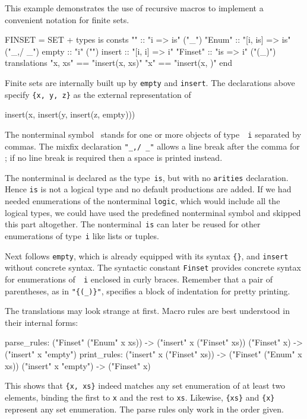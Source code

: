 This example demonstrates the use of recursive macros to implement a
convenient notation for finite sets.
\begin{ttbox}
FINSET = SET +
types
  is
consts
  ""            :: "i => is"                ("_")
  "{\at}Enum"       :: "[i, is] => is"          ("_,/ _")
  empty         :: "i"                      ("{\ttlbrace}{\ttrbrace}")
  insert        :: "[i, i] => i"
  "{\at}Finset"     :: "is => i"                ("{\ttlbrace}(_){\ttrbrace}")
translations
  "{\ttlbrace}x, xs{\ttrbrace}"     == "insert(x, {\ttlbrace}xs{\ttrbrace})"
  "{\ttlbrace}x{\ttrbrace}"         == "insert(x, {\ttlbrace}{\ttrbrace})"
end
\end{ttbox}
Finite sets are internally built up by {\tt empty} and {\tt insert}.  The
declarations above specify \verb|{x, y, z}| as the external representation
of
\begin{ttbox}
insert(x, insert(y, insert(z, empty)))
\end{ttbox}
The nonterminal symbol~ stands for one or more objects of type~{\tt
  i} separated by commas.  The mixfix declaration \hbox{\verb|"_,/ _"|}
allows a line break after the comma for ; if no
line break is required then a space is printed instead.

The nonterminal is declared as the type~{\tt is}, but with no {\tt arities}
declaration.  Hence {\tt is} is not a logical type and no default
productions are added.  If we had needed enumerations of the nonterminal
{\tt logic}, which would include all the logical types, we could have used
the predefined nonterminal symbol  and skipped this part
altogether.  The nonterminal~{\tt is} can later be reused for other
enumerations of type~{\tt i} like lists or tuples.

Next follows {\tt empty}, which is already equipped with its syntax
\verb|{}|, and {\tt insert} without concrete syntax.  The syntactic
constant {\tt\at Finset} provides concrete syntax for enumerations of~{\tt
  i} enclosed in curly braces.  Remember that a pair of parentheses, as in
\verb|"{(_)}"|, specifies a block of indentation for pretty printing.

The translations may look strange at first.  Macro rules are best
understood in their internal forms:
\begin{ttbox}
parse_rules:
  ("{\at}Finset" ("{\at}Enum" x xs))  ->  ("insert" x ("{\at}Finset" xs))
  ("{\at}Finset" x)  ->  ("insert" x "empty")
print_rules:
  ("insert" x ("{\at}Finset" xs))  ->  ("{\at}Finset" ("{\at}Enum" x xs))
  ("insert" x "empty")  ->  ("{\at}Finset" x)
\end{ttbox}
This shows that \verb|{x, xs}| indeed matches any set enumeration of at least
two elements, binding the first to {\tt x} and the rest to {\tt xs}.
Likewise, \verb|{xs}| and \verb|{x}| represent any set enumeration.  
The parse rules only work in the order given.

